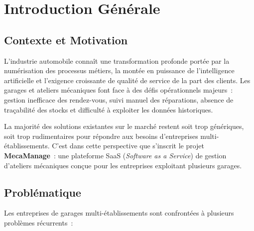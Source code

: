 \documentclass[12pt,a4paper]{report}
\begin{document}
\tableofcontents
\listoffigures
\newpage

\chapter*{Introduction G\'{e}n\'{e}rale}

\section*{Contexte et Motivation}

L'industrie automobile conna\^{i}t une transformation profonde port\'{e}e
par la num\'{e}risation des processus m\'{e}tiers, la mont\'{e}e en puissance
de l'intelligence artificielle et l'exigence croissante de qualit\'{e} de
service de la part des clients. Les garages et ateliers m\'{e}caniques font
face \`{a} des d\'{e}fis op\'{e}rationnels majeurs~: gestion inefficace des
rendez-vous, suivi manuel des r\'{e}parations, absence de tra\c{c}abilit\'{e}
des stocks et difficult\'{e} \`{a} exploiter les donn\'{e}es historiques.

\medskip

La majorit\'{e} des solutions existantes sur le march\'{e} restent soit trop
g\'{e}n\'{e}riques, soit trop rudimentaires pour r\'{e}pondre aux besoins
d'entreprises multi-\'{e}tablissements. C'est dans cette perspective que
s'inscrit le projet \textbf{MecaManage}~: une plateforme SaaS
(\textit{Software as a Service}) de gestion d'ateliers m\'{e}caniques
con\c{c}ue pour les entreprises exploitant plusieurs garages.

\section*{Probl\'{e}matique}

Les entreprises de garages multi-\'{e}tablissements sont confront\'{e}es
\`{a} plusieurs probl\`{e}mes r\'{e}currents~:
\end{document}
